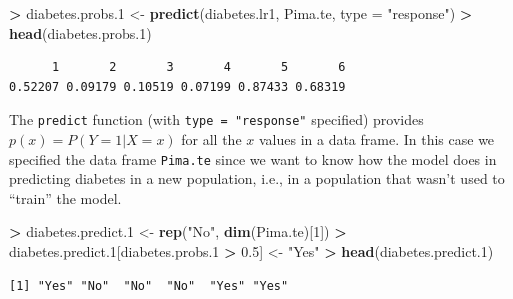 \documentclass[]{krantz}
\makeatletter
\newenvironment{Shaded}{\begin{snugshade}}{\end{snugshade}}
\newcommand{\KeywordTok}[1]{\textcolor[rgb]{0.27,0.27,0.27}{\textbf{#1}}}
\newcommand{\DataTypeTok}[1]{\textcolor[rgb]{0.27,0.27,0.27}{#1}}
\newcommand{\DecValTok}[1]{\textcolor[rgb]{0.06,0.06,0.06}{#1}}
\newcommand{\FloatTok}[1]{\textcolor[rgb]{0.06,0.06,0.06}{#1}}
\newcommand{\StringTok}[1]{\textcolor[rgb]{0.5,0.5,0.5}{#1}}
\newcommand{\OperatorTok}[1]{\textcolor[rgb]{0.43,0.43,0.43}{\textbf{#1}}}
\newcommand{\NormalTok}[1]{#1}
\newenvironment{kframe}{%
\medskip{}
\setlength{\fboxsep}{.8em}
 \def\at@end@of@kframe{}%
 \ifinner\ifhmode%
  \def\at@end@of@kframe{\end{minipage}}%
  \begin{minipage}{\columnwidth}%
 \fi\fi%
 \def\FrameCommand##1{\hskip\@totalleftmargin \hskip-\fboxsep
 \colorbox{shadecolor}{##1}\hskip-\fboxsep
     \hskip-\linewidth \hskip-\@totalleftmargin \hskip\columnwidth}%
 \MakeFramed {\advance\hsize-\width
   \@totalleftmargin\z@ \linewidth\hsize
   \@setminipage}}%
 {\par\unskip\endMakeFramed%
 \at@end@of@kframe}
\renewenvironment{Shaded}{\begin{kframe}}{\end{kframe}}
\makeatother
\begin{document}
\begin{Shaded}
\begin{Highlighting}[]
\OperatorTok{>}\StringTok{ }\NormalTok{diabetes.probs.}\DecValTok{1}\NormalTok{ <-}\StringTok{ }\KeywordTok{predict}\NormalTok{(diabetes.lr1, Pima.te, }\DataTypeTok{type =} \StringTok{"response"}\NormalTok{)}
\OperatorTok{>}\StringTok{ }\KeywordTok{head}\NormalTok{(diabetes.probs.}\DecValTok{1}\NormalTok{)}
\end{Highlighting}
\end{Shaded}

\begin{verbatim}
      1       2       3       4       5       6 
0.52207 0.09179 0.10519 0.07199 0.87433 0.68319 
\end{verbatim}

The \texttt{predict} function (with \texttt{type\ =\ "response"}
specified) provides \(p(x) = P(Y = 1 | X = x)\) for all the \(x\) values
in a data frame. In this case we specified the data frame
\texttt{Pima.te} since we want to know how the model does in predicting
diabetes in a new population, i.e., in a population that wasn't used to
``train'' the model.

\begin{Shaded}
\begin{Highlighting}[]
\OperatorTok{>}\StringTok{ }\NormalTok{diabetes.predict.}\DecValTok{1}\NormalTok{ <-}\StringTok{ }\KeywordTok{rep}\NormalTok{(}\StringTok{"No"}\NormalTok{, }\KeywordTok{dim}\NormalTok{(Pima.te)[}\DecValTok{1}\NormalTok{])}
\OperatorTok{>}\StringTok{ }\NormalTok{diabetes.predict.}\DecValTok{1}\NormalTok{[diabetes.probs.}\DecValTok{1} \OperatorTok{>}\StringTok{ }\FloatTok{0.5}\NormalTok{] <-}\StringTok{ "Yes"}
\OperatorTok{>}\StringTok{ }\KeywordTok{head}\NormalTok{(diabetes.predict.}\DecValTok{1}\NormalTok{)}
\end{Highlighting}
\end{Shaded}

\begin{verbatim}
[1] "Yes" "No"  "No"  "No"  "Yes" "Yes"
\end{verbatim}

\begin{Shaded}
\end{Shaded}
\end{document}

